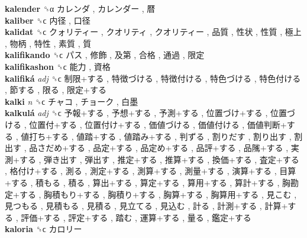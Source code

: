 \textbf{kalender} ␝α   カレンダ ,  カレンダー ,  暦   \\
\textbf{kaliber} ␝ϲ   内径 ,  口径   \\
\textbf{kalidat} ␝ϲ   クォリティー ,  クオリティ ,  クオリティー ,  品質 ,  性状 ,  性質 ,  極上 ,  物柄 ,  特性 ,  素質 ,  質   \\
\textbf{kalifikando} ␝ϲ   パス ,  修飾 ,  及第 ,  合格 ,  通過 ,  限定   \\
\textbf{kalifikashon} ␝ϲ   能力 ,  資格   \\
\textbf{kalifiká} \emph{adj}  ␝ϲ   制限+する ,  特徴づける ,  特徴付ける ,  特色づける ,  特色付ける ,  節する ,  限る ,  限定+する   \\
\textbf{kalki} \emph{n}  ␝ϲ   チャコ ,  チョーク ,  白墨   \\
\textbf{kalkulá} \emph{adj}  ␝ϲ   予報+する ,  予想+する ,  予測+する ,  位置づけ+する ,  位置づける ,  位置付+する ,  位置付け+する ,  価値づける ,  価値付ける ,  価値判断+する ,  値打ち+する ,  値踏+する ,  値踏み+する ,  判ずる ,  割りだす ,  割り出す ,  割出す ,  品さだめ+する ,  品定+する ,  品定め+する ,  品評+する ,  品隲+する ,  実測+する ,  弾き出す ,  弾出す ,  推定+する ,  推算+する ,  換価+する ,  査定+する ,  格付け+する ,  測る ,  測定+する ,  測算+する ,  測量+する ,  演算+する ,  目算+する ,  積もる ,  積る ,  算出+する ,  算定+する ,  算用+する ,  算計+する ,  胸勘定+する ,  胸積もり+する ,  胸積り+する ,  胸算+する ,  胸算用+する ,  見こむ ,  見つもる ,  見積もる ,  見積る ,  見立てる ,  見込む ,  計る ,  計測+する ,  計算+する ,  評価+する ,  評定+する ,  踏む ,  運算+する ,  量る ,  鑑定+する   \\
\textbf{kaloria} ␝ϲ   カロリー   \\
